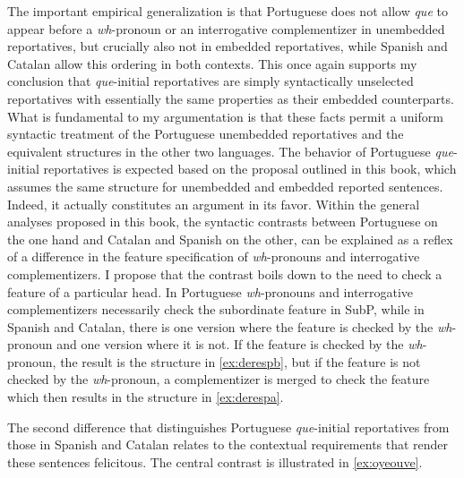 The important empirical generalization is  that Portuguese does not allow \emph{que} to appear before a \textit{wh}-pronoun or an interrogative complementizer in unembedded reportatives, but crucially also not in embedded reportatives, while Spanish and Catalan  allow this ordering in both contexts.  This once again supports   my conclusion that \emph{que}-initial reportatives are simply syntactically unselected reportatives with essentially the same properties as their embedded counterparts. 
What is fundamental to my argumentation is that these facts  permit a uniform syntactic treatment of the Portuguese unembedded reportatives and the equivalent structures in the other two languages.  The behavior of Portuguese \emph{que}-initial reportatives is  expected based on the proposal outlined in this book, which assumes the same structure for unembedded and embedded reported sentences. Indeed, it  actually constitutes  an argument in its favor. 
 Within the general analyses proposed in this book,  the syntactic contrasts between Portuguese on the one hand and Catalan and Spanish on the other,  can be explained as a reflex of a  difference in the feature specification of \textit{wh}-pronouns and interrogative complementizers. I  propose that the contrast boils down to the need to check a feature of a particular head. In  Portuguese \textit{wh}-pronouns and interrogative complementizers necessarily check the subordinate feature in SubP, while in Spanish and Catalan, there is one version where the feature is checked by the \textit{wh}-pronoun and one version where it is not. If the feature is checked by the \textit{wh}-pronoun, the result is the structure in \eqref{ex:derespb}, but if  the feature is not checked by the \textit{wh}-pronoun, a  complementizer is merged to check the feature which then results in the structure in \eqref{ex:derespa}. 






	


The second difference that distinguishes Portuguese \emph{que}-initial reportatives from those in Spanish and Catalan  relates to the contextual requirements that render these sentences felicitous.  The central contrast is illustrated in \eqref{ex:oyeouve}.


